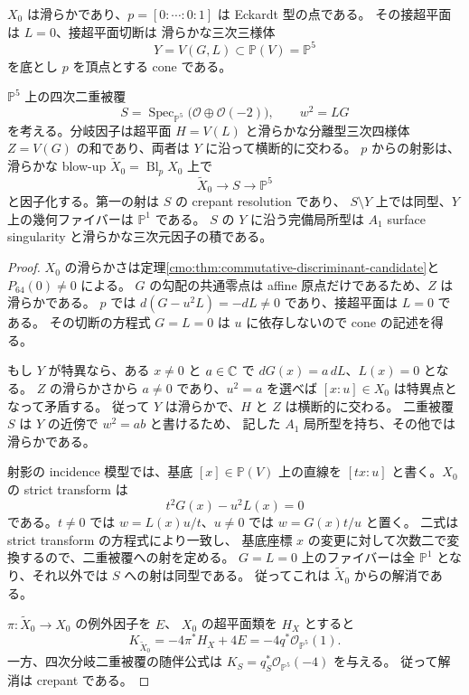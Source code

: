 \begin{proposition}[零係数の具体的射影模型]
\label{cmo:prop:zero-eckardt-resolution}
$X_0$ は滑らかであり、$p=[0:\cdots:0:1]$ は Eckardt 型の点である。
その接超平面は $L=0$、接超平面切断は
滑らかな三次三様体
\[
 Y=V(G,L)\subset\mathbb P(V)=\mathbb P^5
\]
を底とし $p$ を頂点とする cone である。

$\mathbb P^5$ 上の四次二重被覆
\[
 S=\operatorname{Spec}_{\mathbb P^5}
      \bigl(\mathcal O\oplus\mathcal O(-2)\bigr),
 \qquad w^2=LG
\]
を考える。分岐因子は超平面 $H=V(L)$ と滑らかな分離型三次四様体
$Z=V(G)$ の和であり、両者は $Y$ に沿って横断的に交わる。
$p$ からの射影は、滑らかな blow-up $\widetilde X_0=\operatorname{Bl}_pX_0$ 上で
\[
 \widetilde X_0\longrightarrow S\longrightarrow\mathbb P^5
\]
と因子化する。第一の射は $S$ の crepant resolution であり、
$S\setminus Y$ 上では同型、$Y$ 上の幾何ファイバーは $\mathbb P^1$ である。
$S$ の $Y$ に沿う完備局所型は $A_1$ surface singularity と滑らかな三次元因子の積である。
\end{proposition}
\begin{proof}
$X_0$ の滑らかさは定理\ref{cmo:thm:commutative-discriminant-candidate}と $P_{64}(0)\ne0$ による。
$G$ の勾配の共通零点は affine 原点だけであるため、$Z$ は滑らかである。
$p$ では $d(G-u^2L)=-dL\ne0$ であり、接超平面は $L=0$ である。
その切断の方程式 $G=L=0$ は $u$ に依存しないので cone の記述を得る。

もし $Y$ が特異なら、ある $x\ne0$ と $a\in\mathbb C$ で
$dG(x)=a\,dL$、$L(x)=0$ となる。
$Z$ の滑らかさから $a\ne0$ であり、$u^2=a$ を選べば
$[x:u]\in X_0$ は特異点となって矛盾する。
従って $Y$ は滑らかで、$H$ と $Z$ は横断的に交わる。
二重被覆 $S$ は $Y$ の近傍で $w^2=ab$ と書けるため、
記した $A_1$ 局所型を持ち、その他では滑らかである。

射影の incidence 模型では、基底 $[x]\in\mathbb P(V)$ 上の直線を
$[tx:u]$ と書く。$X_0$ の strict transform は
\[
 t^2G(x)-u^2L(x)=0
\]
である。$t\ne0$ では $w=L(x)u/t$、$u\ne0$ では $w=G(x)t/u$ と置く。
二式は strict transform の方程式により一致し、
基底座標 $x$ の変更に対して次数二で変換するので、二重被覆への射を定める。
$G=L=0$ 上のファイバーは全 $\mathbb P^1$ となり、それ以外では $S$ への射は同型である。
従ってこれは $\widetilde X_0$ からの解消である。

$\pi:\widetilde X_0\to X_0$ の例外因子を $E$、
$X_0$ の超平面類を $H_X$ とすると
\[
 K_{\widetilde X_0}=-4\pi^*H_X+4E
   =-4q^*\mathcal O_{\mathbb P^5}(1).
\]
一方、四次分岐二重被覆の随伴公式は
$K_S=q_S^*\mathcal O_{\mathbb P^5}(-4)$ を与える。
従って解消は crepant である。
\end{proof}

